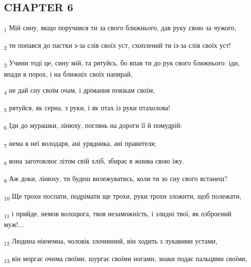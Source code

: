 \subsection{CHAPTER 6}
\begin{tcolorbox}
\textsubscript{1} Мій сину, якщо поручився ти за свого ближнього, дав руку свою за чужого,
\end{tcolorbox}
\begin{tcolorbox}
\textsubscript{2} ти попався до пастки з-за слів своїх уст, схоплений ти із-за слів своїх уст!
\end{tcolorbox}
\begin{tcolorbox}
\textsubscript{3} Учини тоді це, сину мій, та рятуйсь, бо впав ти до рук свого ближнього: іди, впади в порох, і на ближніх своїх напирай,
\end{tcolorbox}
\begin{tcolorbox}
\textsubscript{4} не дай сну своїм очам, і дрімання повікам своїм,
\end{tcolorbox}
\begin{tcolorbox}
\textsubscript{5} рятуйся, як серна, з руки, і як птах із руки птахолова!
\end{tcolorbox}
\begin{tcolorbox}
\textsubscript{6} Іди до мурашки, лінюху, поглянь на дороги її й помудрій:
\end{tcolorbox}
\begin{tcolorbox}
\textsubscript{7} нема в неї володаря, ані урядника, ані правителя;
\end{tcolorbox}
\begin{tcolorbox}
\textsubscript{8} вона заготовлює літом свій хліб, збирає в жнива свою їжу.
\end{tcolorbox}
\begin{tcolorbox}
\textsubscript{9} Аж доки, лінюху, ти будеш вилежуватись, коли ти зо сну свого встанеш?
\end{tcolorbox}
\begin{tcolorbox}
\textsubscript{10} Ще трохи поспати, подрімати ще трохи, руки трохи зложити, щоб полежати,
\end{tcolorbox}
\begin{tcolorbox}
\textsubscript{11} і прийде, немов волоцюга, твоя незаможність, і злидні твої, як озброєний муж!...
\end{tcolorbox}
\begin{tcolorbox}
\textsubscript{12} Людина нікчемна, чоловік злочинний, він ходить з лукавими устами,
\end{tcolorbox}
\begin{tcolorbox}
\textsubscript{13} він моргає очима своїми, шургає своїми ногами, знаки подає пальцями своїми,
\end{tcolorbox}
